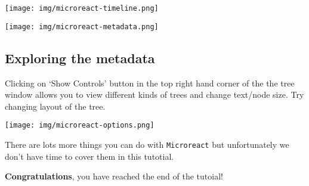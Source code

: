 \documentclass[11pt]{article}
\begin{document}
\begin{center}
\texttt{[image: img/microreact-timeline.png]}
\end{center}



\begin{center}
\texttt{[image: img/microreact-metadata.png]}
\end{center}


    \hypertarget{exploring-the-metadata}{%
\subsection{Exploring the metadata}\label{exploring-the-metadata}}

Clicking on `Show Controls' button in the top right hand corner of the
the tree window allows you to view different kinds of trees and change
text/node size. Try changing layout of the tree.


\begin{center}
\texttt{[image: img/microreact-options.png]}
\end{center}


There are lots more things you can do with \texttt{Microreact} but
unfortunately we don't have time to cover them in this tutotial.

\textbf{Congratulations}, you have reached the end of the tutoial!


\end{document}
